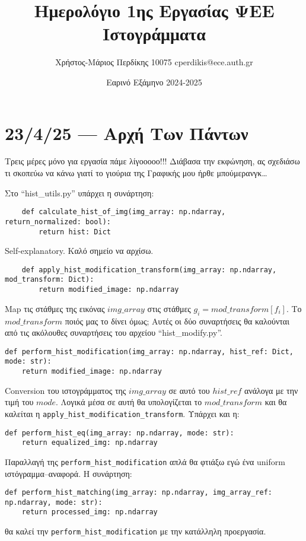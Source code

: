 \documentclass{article}
\title{Ημερολόγιο 1ης Εργασίας ΨΕΕ \\ Ιστογράμματα}
\date{Εαρινό Εξάμηνο 2024-2025}
\author{Χρήστος-Μάριος Περδίκης 10075 cperdikis@ece.auth.gr}
\begin{document}
\maketitle

\section{23/4/25 --- Αρχή Των Πάντων}
Τρεις μέρες μόνο για εργασία πάμε λίγοοοοο!!! Διάβασα την εκφώνηση, ας σχεδιάσω 
τι σκοπεύω να κάνω γιατί το γιούρια της Γραφικής μου ήρθε μπούμερανγκ\ldots 

Στο ``hist\_utils.py'' υπάρχει η συνάρτηση:

\begin{verbatim}
    def calculate_hist_of_img(img_array: np.ndarray, return_normalized: bool):
        return hist: Dict
\end{verbatim}
Self-explanatory. Καλό σημείο να αρχίσω.

\begin{verbatim}
    def apply_hist_modification_transform(img_array: np.ndarray, mod_transform: Dict):
        return modified_image: np.ndarray
\end{verbatim}
Map τις στάθμες της εικόνας $img\_array$ στις στάθμες $g_i = mod\_transform
\left[f_i\right]$. Το $mod\_transform$ ποιός μας το δίνει όμως; Αυτές οι δύο 
συναρτήσεις θα καλούνται από τις ακόλουθες συναρτήσεις του αρχείου 
``hist\_modify.py''.

\begin{verbatim}
def perform_hist_modification(img_array: np.ndarray, hist_ref: Dict, mode: str):
    return modified_image: np.ndarray
\end{verbatim}
Conversion του ιστογράμματος της $img\_array$ σε αυτό του $hist\_ref$ ανάλογα 
με την τιμή του $mode$. Λογικά μέσα σε αυτή θα υπολογίζεται το $mod\_transform$
και θα καλείται η \verb|apply_hist_modification_transform|. Υπάρχει και η:

\begin{verbatim}
def perform_hist_eq(img_array: np.ndarray, mode: str):
    return equalized_img: np.ndarray
\end{verbatim}
Παραλλαγή της \verb|perform_hist_modification| απλά θα φτιάξω εγώ ένα uniform
ιστόγραμμα--αναφορά. Η συνάρτηση:

\begin{verbatim}
def perform_hist_matching(img_array: np.ndarray, img_array_ref: np.ndarray, mode: str):
    return processed_img: np.ndarray
\end{verbatim}
θα καλεί την \verb|perform_hist_modification| με την κατάλληλη προεργασία.
\end{document}
